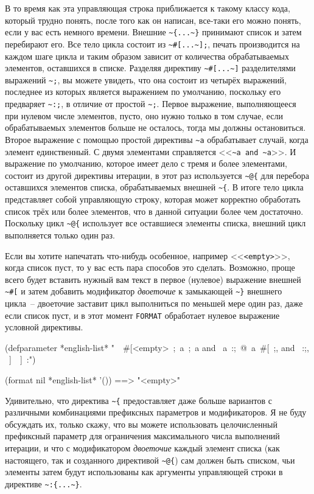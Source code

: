 В то время как эта управляющая строка приближается к такому классу кода, который трудно понять, после того как
он написан, все-таки его можно понять, если у вас есть немного времени. Внешние
\lstinline!~{...~}! принимают список и затем перебирают его. Все тело цикла состоит из \lstinline!~#[...~];!, печать
производится на каждом шаге цикла и таким образом зависит от количества обрабатываемых элементов, оставшихся в
списке. Разделяя директиву \lstinline!~#[...~]! разделителями выражений \lstinline!~;!, вы можете увидеть, что она состоит из
четырёх выражений, последнее из которых является выражением по умолчанию, поскольку его предваряет \lstinline!~:;!, в
отличие от простой \lstinline!~;!. Первое выражение, выполняющееся при нулевом числе элементов, пусто, оно нужно только
в том случае, если обрабатываемых элементов больше не осталось, тогда мы должны остановиться. Второе выражение с
помощью простой директивы \lstinline!~a! обрабатывает случай, когда элемент единственный. С двумя элементами справляется
<<\lstinline!~a and ~a!>>. И выражение по умолчанию, которое имеет дело с тремя и более элементами, состоит из другой
директивы итерации, в этот раз используется \lstinline!~@{! для перебора оставшихся элементов списка, обрабатываемых внешней
\lstinline!~{!. В итоге тело цикла представляет собой управляющую строку, которая может корректно обработать список трёх
или более элементов, что в данной ситуации более чем достаточно. Поскольку цикл \lstinline!~@{! использует все
оставшиеся элементы списка, внешний цикл выполняется только один раз.

Если вы хотите напечатать что-нибудь особенное, например <<\lstinline!<empty>!>>, когда
список пуст, то у вас есть пара способов это сделать. Возможно, проще всего будет вставить
нужный вам текст в первое (нулевое) выражение внешней \lstinline!~#[! и затем добавить
модификатор \textit{двоеточие} к замыкающей \lstinline!~}! внешнего цикла~-- двоеточие
заставит цикл выполниться по меньшей мере один раз, даже если список пуст, и в этот момент
\lstinline{FORMAT} обработает нулевое выражение условной директивы.

\begin{myverb}
(defparameter *english-list*
  "~{~#[<empty>~;~a~;~a and ~a~:;~@{~a~#[~;, and ~:;, ~]~}~]~:}")

(format nil *english-list* '()) ==> "<empty>"
\end{myverb}

Удивительно, что директива \lstinline!~{! предоставляет даже больше вариантов с различными комбинациями префиксных
параметров и модификаторов. Я не буду обсуждать их, только скажу, что вы можете использовать целочисленный
префиксный параметр для ограничения максимального числа выполнений итерации, и что с модификатором \textit{двоеточие}
каждый элемент списка (как настоящего, так и созданного директивой \lstinline!~@{!) сам должен быть списком, чьи
элементы затем будут использованы как аргументы управляющей строки в директиве \lstinline!~:{...~}!.

